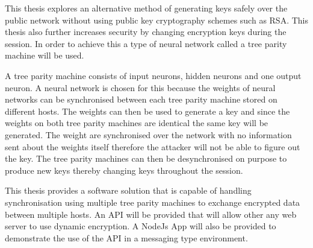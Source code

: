 \documentclass[a4paper, 11pt, oneside]{Thesis}  %
\begin{document}
{This thesis explores an alternative method of generating keys safely over the public network without using public key cryptography schemes such as RSA. This thesis also further increases security by changing encryption keys during the session. In order to achieve this a type of neural network called a tree parity machine will be used.

A tree parity machine consists of input neurons, hidden neurons and one output neuron. A neural network is chosen for this because the weights of neural networks can be synchronised between each tree parity machine stored on different hosts. The weights can then be used to generate a key and since the weights on both tree parity machines are identical the same key will be generated. The weight are synchronised over the network with no information sent about the weights itself therefore the attacker will not be able to figure out the key. The tree parity machines can then be desynchronised on purpose to produce new keys thereby changing keys throughout the session. 

This thesis provides a software solution that is capable of handling synchronisation using multiple tree parity machines to exchange encrypted data between multiple hosts. An API will be provided that will allow other any web server to use dynamic encryption. A NodeJs App will also be provided to demonstrate the use of the API in a messaging type environment.
}

\clearpage  %


\clearpage  %

\pagestyle{fancy}  %
\end{document}

